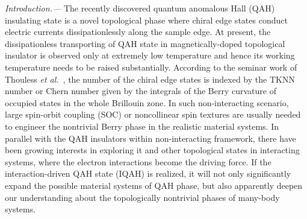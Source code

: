 \documentclass[twocolumn,english,prb,showpacs]{revtex4-1}
\begin{document}
\noindent\textit{Introduction.---}
The recently discovered quantum anomalous Hall (QAH) insulating state is a novel topological phase where chiral edge states conduct electric currents dissipationlessly along the sample edge.\cite{Haldane_1988, Yuruiscience, QAHEscience, ChernSM_XuGang, RanyingPRB, LQF_NJP, QiaoQAHE, QAHEvanderbilt,WengAdvInPhys2015} At present, the dissipationless transporting of QAH state in magnetically-doped topological insulator is observed only at extremely low temperature\cite{QAHEscience} and hence its working temperature needs to be raised substantially. According to the seminar work of Thouless \textit{et al.}~\cite{TKNN1982PRL}, the number of the chiral edge states is indexed by the TKNN number or Chern number given by the integrals of the Berry curvature of occupied states in the whole Brillouin zone. In such non-interacting scenario, large spin-orbit coupling (SOC) \cite{Yuruiscience, ChernSM_XuGang, RanyingPRB, LQF_NJP, QiaoQAHE, QAHEvanderbilt} or noncollinear spin textures\cite{ZhouLiang2016PRL} are usually needed to engineer the nontrivial Berry phase in the realistic material systems. In parallel with the QAH insulators within non-interacting framework, there have been growing interests in exploring it and other topological states in interacting systems,\cite{Raghu2008PRL,SunKai_PRL,Zhu2016Interaction, Wu2016Diagnosis,XiDai2014PRB,Murray2014Renormalization,BL111PRL} where the electron interactions become the driving force. If the interaction-driven QAH state (IQAH) is realized, it will not only significantly expand the possible material systems of QAH phase, but also apparently deepen our understanding about the topologically nontrivial phases of many-body systems.
\end{document}
